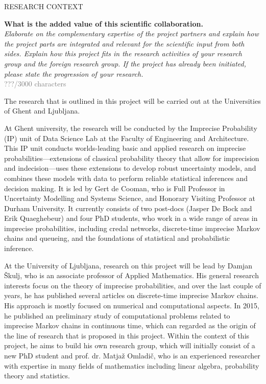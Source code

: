 \documentclass[11pt,dvipsnames,usenames,a4paper]{article}
\begin{document}


\vspace{7pt}




\vspace{5mm}

\begin{shaded}\centering RESEARCH CONTEXT \end{shaded}
\textbf{What is the added value of this scientific collaboration.}\\
\textit{Elaborate on the complementary expertise of the project partners and explain how the project parts are integrated and relevant for the scientific input from both sides. Explain how this project fits in the research activities of your research group and the foreign research group. If the project has already been initiated, please state the progression of your research.}\\
\textcolor{Gray}{???/3000 characters}


The research that is outlined in this project will be carried out at the Universities of Ghent and Ljubljana.

At Ghent university, the research will be conducted by the Imprecise Probability (IP) unit of Data Science Lab at the Faculty of Engineering and Architecture.
This IP unit conducts worlds-leading basic and applied research on imprecise probabilities---extensions of classical probability theory that allow for imprecision and indecision---uses these extensions to develop robust uncertainty models, and combines these models with data to perform reliable statistical inferences and decision making.
It is led by Gert de Cooman, who is Full Professor in Uncertainty Modelling and Systems Science, and Honorary Visiting Professor at Durham University.
It currently consists of two post-docs (Jasper De Bock and Erik Quaeghebeur) and four PhD students, who work in a wide range of areas in imprecise probabilities, including credal networks, discrete-time imprecise Markov chains and queueing, and the foundations of statistical and probabilistic inference.

At the University of Ljubljana, research on this project will be lead by Damjan \v Skulj, who is an associate professor of Applied Mathematics. His general research interests focus on the theory of imprecise probabilities, and over the last couple of years, he has published several articles on discrete-time imprecise Markov chains. His approach is mostly focused on numerical and computational aspects. In 2015, he published an preliminary study of computational problems related to imprecise Markov chains in continuous time, which can regarded as the origin of the line of research that is proposed in this project.
Within the context of this project, he aims to build his own research group, which will initially consist of a new PhD student and prof. dr. Matja\v z Omladi\v c, who is an experienced researcher with expertise in many fields of mathematics including linear algebra, probability theory and statistics. 
\end{document}
